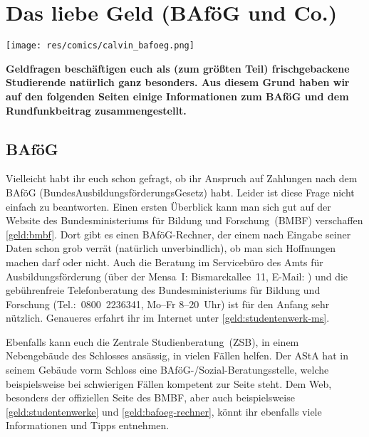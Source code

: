 \section{Das liebe Geld (BAföG und Co.)}

\begin{center}
\vspace{-0.6cm}
\texttt{[image: res/comics/calvin\_bafoeg.png]}
\vspace{-0.4cm}
\end{center}

\begin{multicols*}{2}
\textbf{Geldfragen beschäftigen euch als (zum größten Teil) frischgebackene Studierende natürlich ganz besonders. Aus diesem Grund haben wir auf den folgenden Seiten einige Informationen zum BAföG und dem Rundfunkbeitrag zusammengestellt.}
\vspace{-1em}

\subsection*{BAföG}
Vielleicht habt ihr euch schon gefragt, ob ihr Anspruch auf Zahlungen nach dem BAföG (BundesAusbildungsförderungsGesetz) habt. Leider ist diese Frage nicht einfach zu beantworten. Einen ersten Überblick kann man sich gut auf der Website des Bundesministeriums für Bildung und Forschung~(BMBF) verschaffen \cref{geld:bmbf}. Dort gibt es einen BAföG-Rechner, der einem nach Eingabe seiner Daten schon grob verrät (natürlich unverbindlich), ob man sich Hoffnungen machen darf oder nicht. Auch die Beratung im Servicebüro des Amts für Ausbildungsförderung (über der Mensa~I: Bismarckallee~11, E-Mail: ) und die gebührenfreie Telefonberatung des Bundesministeriums für Bildung und Forschung (Tel.:~0800~2236341, Mo--Fr 8--20~Uhr) ist für den Anfang sehr nützlich. Genaueres erfahrt ihr im Internet unter \cref{geld:studentenwerk-ms}.

Ebenfalls kann euch die Zentrale Studienberatung~(ZSB), in einem Nebengebäude des Schlosses ansässig, in vielen Fällen helfen. Der AStA hat in seinem Gebäude vorm Schloss eine BAföG-/Sozial-Beratungsstelle, welche beispielsweise bei schwierigen Fällen kompetent zur Seite steht. Dem Web, besonders der offiziellen Seite des BMBF, aber auch beispielsweise \cref{geld:studentenwerke} und \cref{geld:bafoeg-rechner}, könnt ihr ebenfalls viele Informationen und Tipps entnehmen.


\end{multicols*}
